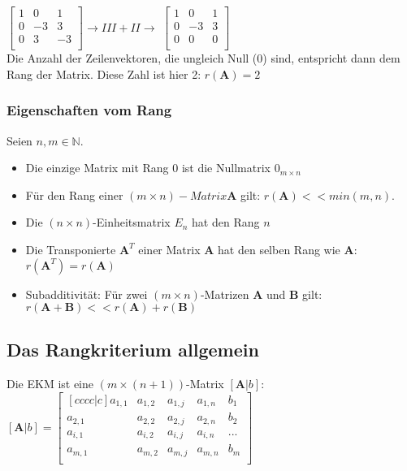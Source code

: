 \documentclass[../main.tex]{subfiles}
\begin{document}
$\begin{bmatrix}
    1 & 0 & 1   \\
    0 & -3 & 3 \\
    0 & 3 & -3 \\
\end{bmatrix} \rightarrow III + II \rightarrow$
$\begin{bmatrix}
    1 & 0 & 1   \\
    0 & -3 & 3 \\
    0 & 0 & 0 \\
\end{bmatrix}$ \\ [7pt]

Die Anzahl der Zeilenvektoren, die ungleich Null (0) sind, entspricht dann dem Rang der Matrix.
Diese Zahl ist hier 2: $r(\mathbf{A})=2$

\subsubsection{Eigenschaften vom Rang}
Seien $n,m \in \mathbb{N}$.
\begin{itemize}
    \item Die einzige Matrix mit Rang 0 ist die Nullmatrix $0_{m\times n}$
    \item Für den Rang einer $(m\times n)-Matrix \mathbf{A}$ gilt: $r(\mathbf{A})<<min(m,n)$.
    \item Die $(n\times n)$-Einheitsmatrix $E_n$ hat den Rang $n$
    \item Die Transponierte $\mathbf{A}^T$ einer Matrix $\mathbf{A}$ hat den selben Rang wie $\mathbf{A}$: $r(\mathbf{A}^T)=r(\mathbf{A})$
    \item Subadditivität: Für zwei $(m\times n)$-Matrizen $\mathbf{A}$ und $\mathbf{B}$ gilt: $r(\mathbf{A}+\mathbf{B}) << r(\mathbf{A}) + r(\mathbf{B})$
\end{itemize}

\subsection{Das Rangkriterium allgemein}
Die EKM ist eine $(m\times(n+1))$-Matrix $[\mathbf{A}|b]$: \\ [7pt]
$[\mathbf{A}|b] = 
\begin{bmatrix}[cccc|c]
    a_{1,1} & a_{1,2} & a_{1,j} & a_{1,n} & b_1 \\
    a_{2,1} & a_{2,2} & a_{2,j} & a_{2,n} & b_2\\
    a_{i,1} & a_{i,2} & a_{i,j} & a_{i,n} & ... \\
    a_{m,1} & a_{m,2} & a_{m,j} & a_{m,n} & b_m \\
\end{bmatrix}$ 
\end{document}
